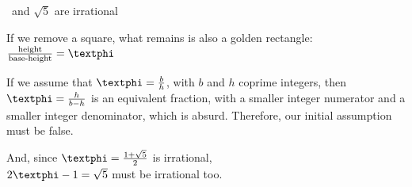 \documentclass[14pt]{beamer}
\begin{document}
\begin{frame}{\textphi\ and $\sqrt{5}$ are irrational}
\begin{center}
\begin{minipage}{0.5\textwidth}
                If we remove a square, what remains is also a golden rectangle: $\tfrac{\text{height}}{\text{base-height}} = \text{\textphi}$\bigskip

                If we assume that $\text{\textphi} = \tfrac{b}{h}$, with $b$ and $h$ coprime integers, then $\text{\textphi} = \tfrac{h}{b-h}$ is an equivalent fraction, with a smaller integer numerator and a smaller integer denominator, which is absurd. Therefore, our initial assumption must be false.\bigskip

                And, since $\text{\textphi} =\tfrac{1+\sqrt{5}}{2}$ is irrational,\\[0.25ex]$2\text{\textphi} - 1 = \sqrt{5}$ must be irrational too.
            \end{minipage}
        \end{center}
    \end{frame}

\end{document}
